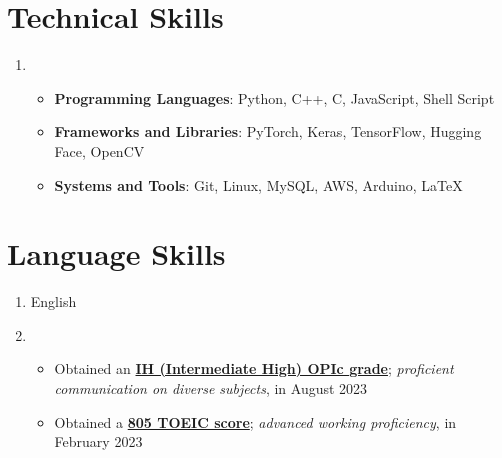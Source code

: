 \documentclass[letterpaper,11pt]{article}
\begin{document}
    
    \section{Technical Skills}
    \begin{enumerate}[noitemsep, leftmargin=*,label=]
        \item{
            \begin{itemize}[label=\bullet]
                \item{\textbf{Programming Languages}: Python, C++, C, JavaScript, Shell Script}
                \item{\textbf{Frameworks and Libraries}: PyTorch, Keras, TensorFlow, Hugging Face, OpenCV}
                \item{\textbf{Systems and Tools}: Git, Linux, MySQL, AWS, Arduino, \LaTeX}
            \end{itemize}
        }
    \end{enumerate}
    
    \section{Language Skills}    
    \begin{enumerate}[noitemsep, leftmargin=*,label=]
        \item{English}
        \item{
            \begin{itemize}[label=\bullet]
                \item{Obtained an \textbf{\href{https://oneonlee.github.io/my/certificate/OPIc_Score_Report.pdf}{IH (Intermediate High) OPIc grade}}; \textit{proficient communication on diverse subjects}, in August 2023}
                \item{Obtained a \textbf{\href{https://oneonlee.github.io/my/certificate/TOEIC_OFFICIAL_SCORE_CERTIFICATE.pdf}{805 TOEIC score}}; \textit{advanced working proficiency}, in February 2023}
            \end{itemize}
        }
    \end{enumerate}
\end{document}
